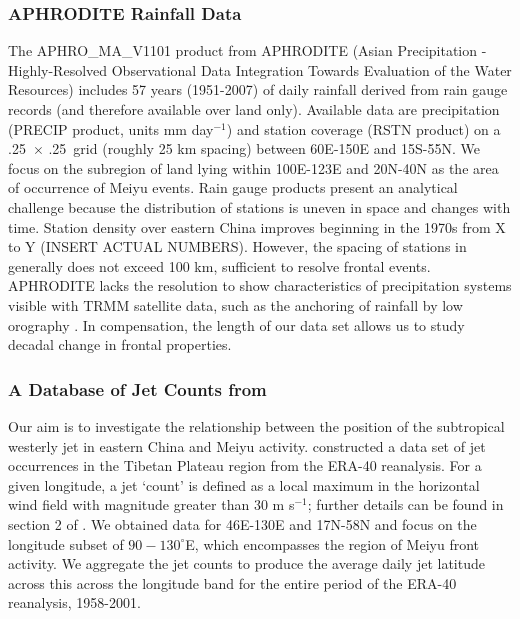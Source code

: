 \documentclass[draft,grl]{AGUTeX}
\begin{document}
\begin{article}
\subsubsection{APHRODITE Rainfall Data}

	The APHRO\_MA\_V1101 product from APHRODITE (Asian Precipitation - Highly-Resolved Observational Data Integration Towards Evaluation of the Water Resources) \citep{Yatagai2012} includes 57 years (1951-2007) of daily  rainfall derived from rain gauge records (and therefore available over land only). Available data are precipitation (PRECIP product, units mm day$^{-1}$) and station coverage (RSTN product) on a .25\textdegree\ $\times$ .25\textdegree\ grid (roughly 25 km spacing) between 60\textdegree E-150\textdegree E and 15\textdegree S-55\textdegree N. We focus on the subregion of land lying within 100\textdegree E-123\textdegree E and 20\textdegree N-40\textdegree N as the area of occurrence of Meiyu events. Rain gauge products present an analytical challenge because the distribution of stations is uneven in space and changes with time. Station density over eastern China improves beginning in the 1970s from X to Y (INSERT ACTUAL NUMBERS). However, the spacing of stations in generally does not exceed 100 km, sufficient to resolve frontal events. APHRODITE lacks the resolution to show characteristics of precipitation systems visible with TRMM satellite data, such as the anchoring of rainfall by low orography \citep{Xu2009}. In compensation, the length of our data set allows us to study decadal change in frontal properties. 
	
\subsubsection{A Database of Jet Counts from \citep{Schiemann2009}} 

	Our aim is to investigate the relationship between the position of the subtropical westerly jet in eastern China and Meiyu activity. \citep{Schiemann2009} constructed a data set of jet occurrences in the Tibetan Plateau region from the ERA-40 reanalysis.  For a given longitude, a jet `count'  is defined as a local maximum in the horizontal wind field with magnitude greater than $30$ m s$^{-1}$; further details can be found in section 2 of \citep{Schiemann2009}. We obtained data for 46\textdegree E-130\textdegree E and 17\textdegree N-58\textdegree N and focus on the longitude subset of $90-130^\circ$E, which encompasses the region of Meiyu front activity. We aggregate the jet counts to produce the average daily jet latitude across this across the longitude band for the entire period of the ERA-40 reanalysis, 1958-2001. 
	

\end{article}
\end{document}
